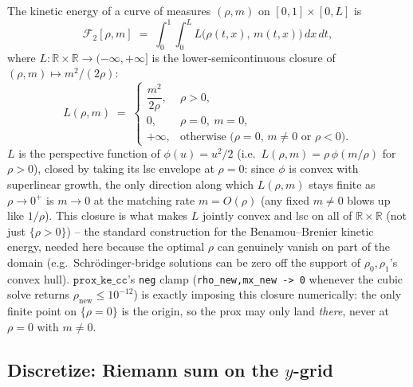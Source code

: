 \documentclass[11pt]{article}
\newcommand{\code}[1]{\texttt{#1}}
\begin{document}
The kinetic energy of a curve of measures $(\rho,m)$ on $[0,1]\times[0,L]$ is
\begin{equation}
  \label{eq:F2-continuous}
  \mathcal{F}_2[\rho,m] \;=\; \int_0^1\!\!\int_0^L L\bigl(\rho(t,x),\,m(t,x)\bigr)\,dx\,dt,
\end{equation}
where $L:\mathbb{R}\times\mathbb{R}\to(-\infty,+\infty]$ is the lower-semicontinuous
closure of $(\rho,m)\mapsto m^2/(2\rho)$:
\begin{equation}
  \label{eq:L}
  L(\rho,m) \;=\;
  \begin{cases}
    \dfrac{m^2}{2\rho}, & \rho > 0, \\[6pt]
    0, & \rho = 0,\ m = 0, \\[4pt]
    +\infty, & \text{otherwise (}\rho=0,\,m\neq0\text{ or }\rho<0\text{)}.
  \end{cases}
\end{equation}
$L$ is the perspective function of $\phi(u)=u^2/2$ (i.e.\ $L(\rho,m)=\rho\,\phi(m/\rho)$
for $\rho>0$), closed by taking its lsc envelope at $\rho=0$: since $\phi$ is convex with
superlinear growth, the only direction along which $L(\rho,m)$ stays finite as
$\rho\to0^+$ is $m\to0$ at the matching rate $m=O(\rho)$ (any fixed $m\neq0$ blows up like
$1/\rho$). This closure is what makes $L$ jointly convex and lsc on all of
$\mathbb{R}\times\mathbb{R}$ (not just $\{\rho>0\}$) -- the standard construction for the
Benamou--Brenier kinetic energy, needed here because the optimal $\rho$ can genuinely
vanish on part of the domain (e.g.\ Schr\"odinger-bridge solutions can be zero off the
support of $\rho_0,\rho_1$'s convex hull). $\code{prox\_ke\_cc}$'s \code{neg} clamp
(\code{rho\_new,mx\_new -> 0} whenever the cubic solve returns $\rho_{\mathrm{new}}\le
10^{-12}$) is exactly imposing this closure numerically: the only finite point on
$\{\rho=0\}$ is the origin, so the prox may only land \emph{there}, never at $\rho=0$
with $m\neq0$.

\subsection{Discretize: Riemann sum on the $y$-grid}
\end{document}
